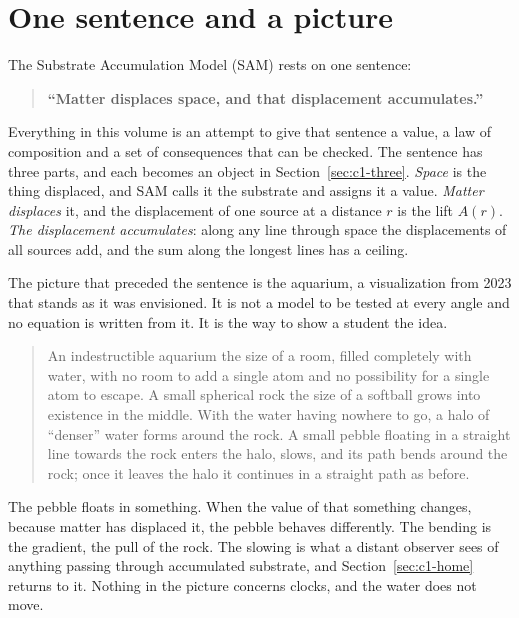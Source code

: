 \begin{abstract}
This chapter is the conceptual introduction to the volume. It states the single sentence of the Substrate Accumulation Model, the three objects that sentence names (the floor $A_0$, the lift $A(r)$ and the ceiling $1/\pi$), and the two readings of the lift that a clock and a ruler make. It states the agreement theorem for the static exterior, the two numbers SAM keeps between any pair of endpoints where most frameworks keep one, the SAM law for the line of sight, and the clock in motion. It ends where SAM parts from general relativity: at $A=1$, a closed sphere with no interior, which every traveler approaches and none crosses. Every statement is labeled as derived, declared or open, and the closing section records the verification behind each.
\end{abstract}

\section{One sentence and a picture}
\label{sec:c1-sentence}

The Substrate Accumulation Model (SAM) rests on one sentence:
\begin{quote}
\textbf{``Matter displaces space, and that displacement accumulates.''}
\end{quote}
Everything in this volume is an attempt to give that sentence a value, a law of composition and a set of consequences that can be checked. The sentence has three parts, and each becomes an object in Section~\ref{sec:c1-three}. \emph{Space} is the thing displaced, and SAM calls it the substrate and assigns it a value. \emph{Matter displaces} it, and the displacement of one source at a distance $r$ is the lift $A(r)$. \emph{The displacement accumulates}: along any line through space the displacements of all sources add, and the sum along the longest lines has a ceiling.

The picture that preceded the sentence is the aquarium, a visualization from 2023 that stands as it was envisioned. It is not a model to be tested at every angle and no equation is written from it. It is the way to show a student the idea.
\begin{quote}
An indestructible aquarium the size of a room, filled completely with water, with no room to add a single atom and no possibility for a single atom to escape. A small spherical rock the size of a softball grows into existence in the middle. With the water having nowhere to go, a halo of ``denser'' water forms around the rock. A small pebble floating in a straight line towards the rock enters the halo, slows, and its path bends around the rock; once it leaves the halo it continues in a straight path as before.
\end{quote}
The pebble floats in something. When the value of that something changes, because matter has displaced it, the pebble behaves differently. The bending is the gradient, the pull of the rock. The slowing is what a distant observer sees of anything passing through accumulated substrate, and Section~\ref{sec:c1-home} returns to it. Nothing in the picture concerns clocks, and the water does not move.

